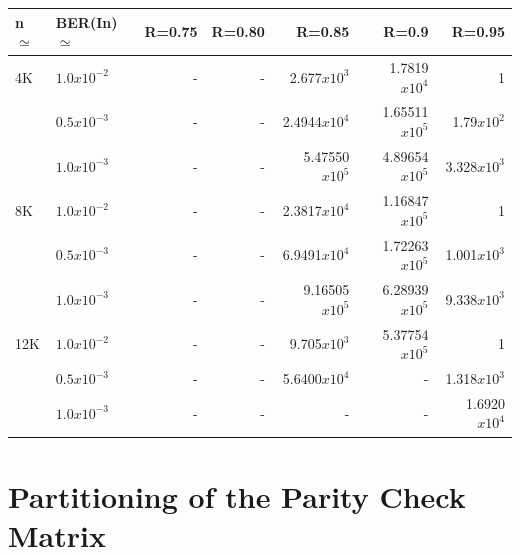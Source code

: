 \documentclass[twopage,12pt,a4paper]{report}
\begin{document}
\begin{raggedright}
\begin{center}
\begin{tabular}{|l|l|r|r|r|r|r|}
\hline
n$\simeq$   & BER(In)$\simeq$    & R=0.75  & R=0.80  & R=0.85  & R=0.9 & R=0.95 \\ \hline
4K  & $1.0x10^{-2}$  & -    & - &2.677$x10^{3}$           &1.7819$x10^{4}$       &1       \\ 
    & $0.5x10^{-3}$  &-     & - &2.4944$x10^{4}$          &1.65511$x10^{5}$		&1.79$x10^{2}$   \\ 
    & $1.0x10^{-3}$  & -   & -  &5.47550$x10^{5}$         &4.89654$x10^{5}$     &3.328$x10^{3}$ \\ \hline
8K  & $1.0x10^{-2}$   & -   & - &2.3817$x10^{4}$          &1.16847$x10^{5}$        &1   \\ 
    & $0.5x10^{-3}$   & -     & -&6.9491$x10^{4}$          &1.72263$x10^{5}$       &1.001$x10^{3}$  \\ 
    & $1.0x10^{-3}$   & -   & -  &9.16505 $x10^{5}$        &6.28939$x10^{5}$       &9.338$x10^{3}$  \\ \hline
12K & $1.0x10^{-2}$   & -   & -  &9.705$x10^{3}$          &5.37754$x10^{5}$       	&1       \\
    & $0.5x10^{-3}$   & -     & -&5.6400$x10^{4}$          &-     			 		&1.318$x10^{3}$  \\ 
    & $1.0x10^{-3}$   & - & - &- 			             &-    					 &1.6920$x10^{4}$   \\ \hline 
\end{tabular}
\end{center}



\chapter{Partitioning of the Parity Check Matrix}


\end{raggedright}
\end{document}
